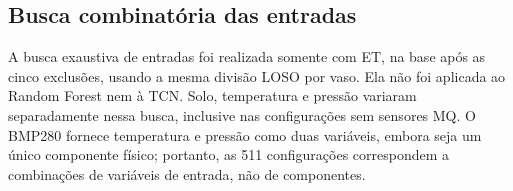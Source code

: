 \subsection{Busca combinatória das entradas}
\label{subsec:busca_combinatoria_loso}

A busca exaustiva de entradas foi realizada somente com ET, na base após
as cinco exclusões, usando a mesma divisão LOSO por vaso. Ela não foi
aplicada ao Random Forest nem à TCN.
Solo, temperatura e pressão variaram separadamente nessa busca,
inclusive nas configurações sem sensores MQ. O BMP280 fornece
temperatura e pressão como duas variáveis, embora seja um único componente
físico; portanto, as 511 configurações correspondem a combinações de
variáveis de entrada, não de componentes.

